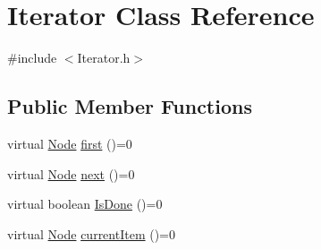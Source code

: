 \hypertarget{class_iterator}{\section{Iterator Class Reference}
\label{class_iterator}
}


{\ttfamily \#include $<$Iterator.\-h$>$}

\subsection*{Public Member Functions}
\begin{DoxyCompactItemize}
\item 
virtual \hyperlink{class_node}{Node} \hyperlink{class_iterator_a329c4fa25c356d032d2244e891d54165}{first} ()=0
\item 
virtual \hyperlink{class_node}{Node} \hyperlink{class_iterator_a7244d558d3bb124a0fbedbaa4ad7bcac}{next} ()=0
\item 
virtual boolean \hyperlink{class_iterator_ae4ad86a90a1332bac83356775946cf3e}{Is\-Done} ()=0
\item 
virtual \hyperlink{class_node}{Node} \hyperlink{class_iterator_adea3c41bfff8601918e92b0de87cb63a}{current\-Item} ()=0
\end{DoxyCompactItemize}


